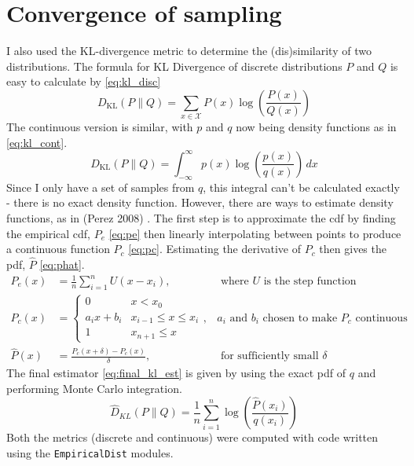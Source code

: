 \section{Convergence of sampling}
I also used the KL-divergence metric to determine the (dis)similarity of two distributions. The formula for KL Divergence of discrete distributions $P$ and $Q$ is easy to calculate by \eqref{eq:kl_disc}
% 
\begin{equation} \label{eq:kl_disc}
	{D_{\text{KL}}(P\parallel Q)=\sum _{x\in {\mathcal {X}}}P(x)\log \left({\frac {P(x)}{Q(x)}}\right)} 
\end{equation} 
% 
The continuous version is similar, with $p$ and $q$ now being density functions as in \eqref{eq:kl_cont}. 
% 
\begin{equation} \label{eq:kl_cont}	
	{D_\text{KL}}(P\parallel Q)=\int _{-\infty }^{\infty }p(x)\log \left({\frac {p(x)}{q(x)}}\right)\,dx
\end{equation} 
% 
Since I only have a set of samples from $q$, this integral can't be calculated exactly - there is no exact density function. However, there are ways to estimate density functions, as in (Perez 2008) \cite{perez2008kullback}. The first step is to approximate the cdf by finding the empirical cdf, $P_e$ \eqref{eq:pe} then linearly interpolating between points to produce a continuous function $P_c$ \eqref{eq:pc}. Estimating the derivative of $P_c$ then gives the pdf, $\hat{P}$ \eqref{eq:phat}. 
% 
\begin{align}
	P_e(x)     & = \frac1{n}\sum_{i=1}^n U(x-x_i) ,        & \text{ where $U$ is the step function}\label{eq:pe}    \\ 
	P_c(x)     & = \begin{cases}                                                                                
	0          & x<x_0                                                                                          \\
	a_ix+b_i   & x_{i-1} \leq x \le x_i                                                                         \\
	1          & x_{n+1} \leq x                                                                                 
	\end{cases} \label{eq:pc} ,& \text{$a_i$ and $b_i$ chosen to make $P_c$ continuous }\\ 
	\hat{P}(x) & = \frac{P_c(x+\delta) - P_c(x)}{\delta} , & \text{ for sufficiently small }\delta  \label{eq:phat} 
\end{align}
% 
The final estimator \eqref{eq:final_kl_est} is given by using the exact pdf of $q$ and performing Monte Carlo integration.
% 
\begin{equation}
	\label{eq:final_kl_est}
	\hat{D}_{KL}(P \| Q) = \frac1{n}\sum_{i=1}^n \log\left(\frac{\hat{P}(x_i)}{q(x_i)}\right) 
\end{equation}
% 
Both the metrics (discrete and continuous) were computed with code written using the \texttt{EmpiricalDist} modules.
				
